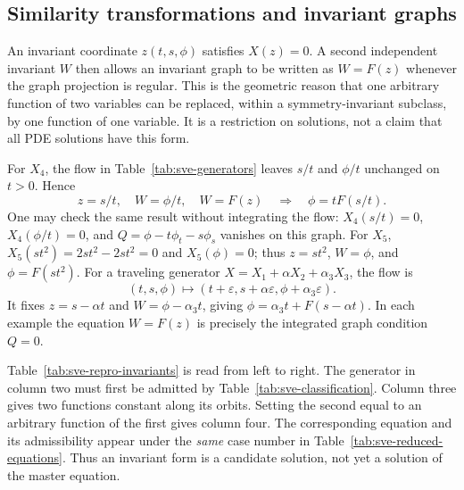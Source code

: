 \documentclass[11pt]{article}
\theoremstyle{definition}
\begin{document}
\subsection{Similarity transformations and invariant graphs}
An invariant coordinate $z(t,s,\phi)$ satisfies $X(z)=0$. A second
independent invariant $W$ then allows an invariant graph to be written
as $W=F(z)$ whenever the graph projection is regular. This is the
geometric reason that one arbitrary function of two variables can be
replaced, within a symmetry-invariant subclass, by one function of one
variable. It is a restriction on solutions, not a claim that all PDE
solutions have this form.

For $X_4$, the flow in Table~\ref{tab:sve-generators} leaves $s/t$ and
$\phi/t$ unchanged on $t>0$. Hence
\[
 z=s/t,\quad W=\phi/t,\quad W=F(z)
 \quad\Longrightarrow\quad \phi=tF(s/t).
\]
One may check the same result without integrating the flow:
$X_4(s/t)=0$, $X_4(\phi/t)=0$, and
$Q=\phi-t\phi_t-s\phi_s$ vanishes on this graph.
For $X_5$, $X_5(st^2)=2st^2-2st^2=0$ and $X_5(\phi)=0$;
thus $z=st^2$, $W=\phi$, and $\phi=F(st^2)$.
For a traveling generator
$X=X_1+\alpha X_2+\alpha_3X_3$, the flow is
\[
 (t,s,\phi)\longmapsto
 (t+\varepsilon,s+\alpha\varepsilon,\phi+\alpha_3\varepsilon).
\]
It fixes $z=s-\alpha t$ and $W=\phi-\alpha_3t$, giving
$\phi=\alpha_3t+F(s-\alpha t)$. In each example the equation
$W=F(z)$ is precisely the integrated graph condition $Q=0$.

Table~\ref{tab:sve-repro-invariants} is read from left to right.
The generator in column two must first be admitted by
Table~\ref{tab:sve-classification}. Column three gives two functions
constant along its orbits. Setting the second equal to an arbitrary
function of the first gives column four. The corresponding equation and
its admissibility appear under the \emph{same} case number in
Table~\ref{tab:sve-reduced-equations}. Thus an invariant form is a
candidate solution, not yet a solution of the master equation.
\end{document}
